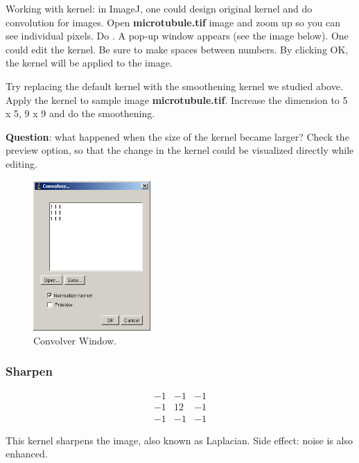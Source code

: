 \begin{indentexercise}{1}
 Working with kernel: in ImageJ, one could
design original kernel and do convolution for images.
Open \textbf{microtubule.tif} image and
zoom up so you can see individual pixels. Do . A pop-up window
appears (see the image below). One could edit the kernel. Be sure to
make spaces between numbers. By clicking OK, the kernel will be applied
to the image. 

Try replacing the default kernel with the smoothening kernel we studied
above. Apply the kernel to sample image
\textbf{microtubule.tif}. Increase the
dimension to 5 x 5, 9 x 9 and do the smoothening. 

\textbf{Question}: what happened when the size of the kernel became
larger? Check the preview option, so that the change in the kernel
could be visualized directly while editing.

\begin{figure}[htbp]
\begin{center}
\includegraphics[width=4.471cm]{img/CMCIBasicCourse201102-img57.png}
\caption{ Convolver Window.}
\label{fig:img57}
\end{center}
\end{figure} 

\end{indentexercise}

\subsubsection{Sharpen }

\[
 \begin{matrix}
  -1 & -1 & -1 \\
  -1 & 12 & -1 \\
  -1 & -1 & -1
 \end{matrix}
\]

This kernel sharpens the image, also known as Laplacian. Side effect:
noise is also enhanced. 


